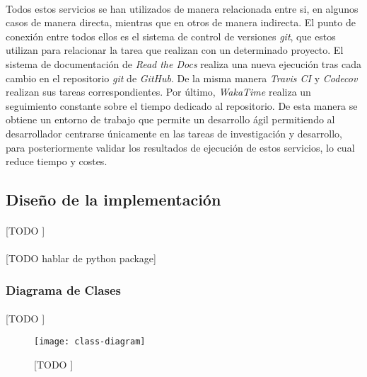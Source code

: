 \documentclass{subfiles}
\begin{document}
        \paragraph{}
        Todos estos servicios se han utilizados de manera relacionada entre si, en algunos casos de manera directa, mientras que en otros de manera indirecta. El punto de conexión entre todos ellos es el sistema de control de versiones \emph{git}, que estos utilizan para relacionar la tarea que realizan con un determinado proyecto. El sistema de documentación de \emph{Read the Docs} realiza una nueva ejecución tras cada cambio en el repositorio \emph{git} de \emph{GitHub}. De la misma manera \emph{Travis CI} y \emph{Codecov} realizan sus tareas correspondientes. Por último, \emph{WakaTime} realiza un seguimiento constante sobre el tiempo dedicado al repositorio. De esta manera se obtiene un entorno de trabajo que permite un desarrollo ágil permitiendo al desarrollador centrarse únicamente en las tareas de investigación y desarrollo, para posteriormente validar los resultados de ejecución de estos servicios, lo cual reduce tiempo y costes.

      \subsection{Diseño de la implementación}
      \label{sec:implementation_design}

        \paragraph{}
        [TODO ]

        \paragraph{}
        [TODO hablar de python package]

        \subsubsection{Diagrama de Clases}
        \label{sec:class_diagram}

          \paragraph{}
          [TODO ]

          \begin{figure}
            \centering
            \texttt{[image: class-diagram]}
            \caption{[TODO ]}
            \label{img:class_diagram}
          \end{figure}
\end{document}
